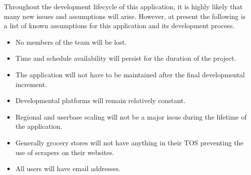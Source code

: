 %
%
%
%
Throughout the development lifecycle of this application, it is highly likely that many new issues and assumptions will arise.  
However, at present the following is a list of known assumptions for this application and its development process.

\begin{itemize}
  \item No members of the team will be lost.
  \item Time and schedule availability will persist for the duration of the project.
  \item The application will not have to be maintained after the final developmental increment.
  \item Developmental platforms will remain relatively constant.
  \item Regional and userbase scaling will not be a major issue during the lifetime of the application.
  \item Generally grocery stores will not have anything in their TOS preventing the use of scrapers on their websites.
  \item All users will have email addresses.
\end{itemize}